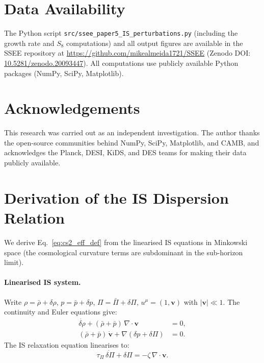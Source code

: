 \documentclass[12pt,a4paper]{article}
\newcommand{\tauPi}{\tau_\Pi}
\begin{document}
\section*{Data Availability}

The Python script \texttt{src/ssee\_paper5\_IS\_perturbations.py} (including
the growth rate and $S_8$ computations) and all output figures are available in
the SSEE repository at
\url{https://github.com/mikealmeida1721/SSEE}
(Zenodo DOI: \href{https://doi.org/10.5281/zenodo.20093447}{10.5281/zenodo.20093447}).
All computations use publicly available Python packages (NumPy, SciPy, Matplotlib).

\section*{Acknowledgements}

This research was carried out as an independent investigation.
The author thanks the open-source communities behind NumPy, SciPy, Matplotlib,
and CAMB, and acknowledges the Planck, DESI, KiDS, and DES teams for
making their data publicly available.

\appendix

\section{Derivation of the IS Dispersion Relation}
\label{app:dispersion}

We derive Eq.~\eqref{eq:cs2_eff_def} from the linearised IS equations in Minkowski
space (the cosmological curvature terms are subdominant in the sub-horizon limit).

\paragraph{Linearised IS system.}
Write $\rho = \bar\rho + \delta\rho$, $p = \bar p + \delta p$, $\Pi = \bar\Pi + \delta\Pi$,
$u^\mu = (1,\mathbf{v})$ with $|\mathbf{v}| \ll 1$.
The continuity and Euler equations give:
\begin{align}
  \dot{\delta\rho} + (\bar\rho+\bar p)\,\nabla\cdot\mathbf{v} &= 0, \\
  (\bar\rho+\bar p)\,\dot{\mathbf{v}} + \nabla(\delta p + \delta\Pi) &= 0.
\end{align}
The IS relaxation equation linearises to:
\begin{equation}
  \tauPi\,\dot{\delta\Pi} + \delta\Pi = -\zeta\,\nabla\cdot\mathbf{v}.
\end{equation}
\end{document}
